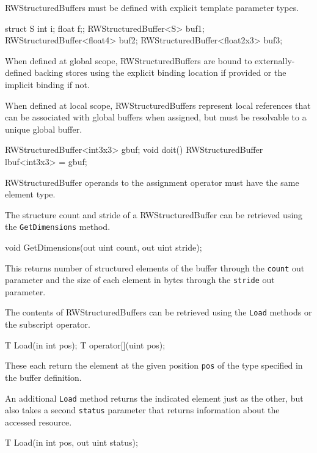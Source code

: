 
RWStructuredBuffers must be defined with explicit template parameter types.
\begin{HLSL}
  struct S {int i; float f;};
  RWStructuredBuffer<S> buf1;
  RWStructuredBuffer<float4> buf2;
  RWStructuredBuffer<float2x3> buf3;
\end{HLSL}

When defined at global scope, RWStructuredBuffers are bound to externally-defined backing stores
using the explicit binding location if provided or the implicit binding if not.

When defined at local scope, RWStructuredBuffers represent local references
that can be associated with global buffers when assigned,
but must be resolvable to a unique global buffer.

\begin{HLSL}
  RWStructuredBuffer<int3x3> gbuf;
  void doit() {
    RWStructuredBuffer lbuf<int3x3> = gbuf;
  }
\end{HLSL}
RWStructuredBuffer operands to the assignment operator must have the same element type.


The structure count and stride of a RWStructuredBuffer can be retrieved using the \texttt{GetDimensions} method.
\begin{HLSL}
void GetDimensions(out uint count, out uint stride);
\end{HLSL}

This returns number of structured elements of the buffer through the \texttt{count} out parameter
and the size of each element in bytes through the \texttt{stride} out parameter.


The contents of RWStructuredBuffers can be retrieved using the \texttt{Load} methods
or the subscript operator.

\begin{HLSL}
 T Load(in int pos);
 T operator[](uint pos);
\end{HLSL}

These each return the element at the given position \texttt{pos} of the type specified in the buffer definition.

An additional \texttt{Load} method returns the indicated element just as the other,
but also takes a second \texttt{status} parameter that returns information about the accessed resource.
\begin{HLSL}
 T Load(in int pos, out uint status);
\end{HLSL}

